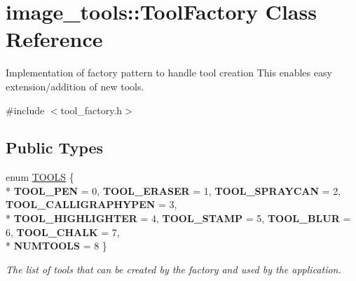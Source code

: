 \hypertarget{classimage__tools_1_1ToolFactory}{}\section{image\+\_\+tools\+:\+:Tool\+Factory Class Reference}
\label{classimage__tools_1_1ToolFactory}


Implementation of factory pattern to handle tool creation This enables easy extension/addition of new tools.  




{\ttfamily \#include $<$tool\+\_\+factory.\+h$>$}

\subsection*{Public Types}
\begin{DoxyCompactItemize}
\item 
enum \hyperlink{classimage__tools_1_1ToolFactory_a75e9b7d0223f34953e6ea2c45612396f}{T\+O\+O\+LS} \{ \\*
{\bfseries T\+O\+O\+L\+\_\+\+P\+EN} = 0, 
{\bfseries T\+O\+O\+L\+\_\+\+E\+R\+A\+S\+ER} = 1, 
{\bfseries T\+O\+O\+L\+\_\+\+S\+P\+R\+A\+Y\+C\+AN} = 2, 
{\bfseries T\+O\+O\+L\+\_\+\+C\+A\+L\+L\+I\+G\+R\+A\+P\+H\+Y\+P\+EN} = 3, 
\\*
{\bfseries T\+O\+O\+L\+\_\+\+H\+I\+G\+H\+L\+I\+G\+H\+T\+ER} = 4, 
{\bfseries T\+O\+O\+L\+\_\+\+S\+T\+A\+MP} = 5, 
{\bfseries T\+O\+O\+L\+\_\+\+B\+L\+UR} = 6, 
{\bfseries T\+O\+O\+L\+\_\+\+C\+H\+A\+LK} = 7, 
\\*
{\bfseries N\+U\+M\+T\+O\+O\+LS} = 8
 \}\hypertarget{classimage__tools_1_1ToolFactory_a75e9b7d0223f34953e6ea2c45612396f}{}\label{classimage__tools_1_1ToolFactory_a75e9b7d0223f34953e6ea2c45612396f}
\begin{DoxyCompactList}\small\item\em The list of tools that can be created by the factory and used by the application. \end{DoxyCompactList}
\end{DoxyCompactItemize}
